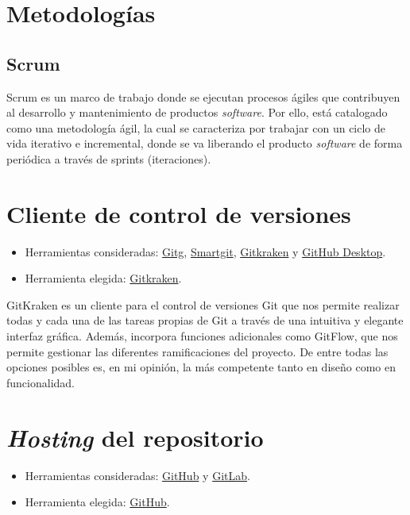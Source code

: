 
\section{Metodologías}

\subsection{Scrum}

Scrum es un marco de trabajo donde se ejecutan procesos ágiles que
contribuyen al desarrollo y mantenimiento de productos \emph{software}.
Por ello, está catalogado como una metodología ágil, la cual se
caracteriza por trabajar con un ciclo de vida iterativo e incremental,
donde se va liberando el producto \emph{software} de forma periódica a
través de {sprints} (iteraciones).

\section{Cliente de control de versiones}

\begin{itemize}
\tightlist
\item
  Herramientas consideradas:
  \href{https://wiki.gnome.org/Apps/Gitg/}{Gitg},
  \href{https://www.syntevo.com/smartgit/}{Smartgit},
  \href{https://www.gitkraken.com/}{Gitkraken} y
  \href{https://desktop.github.com/}{GitHub Desktop}.
\item
  Herramienta elegida: \href{https://www.gitkraken.com/}{Gitkraken}.
\end{itemize}

GitKraken es un cliente para el control de versiones {Git} que nos
permite realizar todas y cada una de las tareas propias de {Git} a
través de una intuitiva y elegante interfaz gráfica. Además, incorpora
funciones adicionales como {GitFlow}, que nos permite gestionar las
diferentes ramificaciones del proyecto. De entre todas las opciones
posibles es, en mi opinión, la más competente tanto en diseño como en
funcionalidad.

\section{\emph{Hosting} del repositorio}

\begin{itemize}
\tightlist
\item
  Herramientas consideradas: \href{https://github.com/}{GitHub} y
  \href{https://gitlab.com/}{GitLab}.
\item
  Herramienta elegida: \href{https://github.com/}{GitHub}.
\end{itemize}

